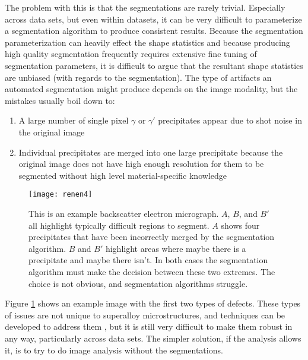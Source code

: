 \documentclass[review]{elsarticle}
\begin{document}
		The problem with this is that the segmentations are rarely trivial. Especially across data sets, but even within datasets, it can be very difficult to parameterize a segmentation algorithm to produce consistent results. Because the segmentation parameterization can heavily effect the shape statistics and because producing high quality segmentation frequently requires extensive fine tuning of segmentation parameters, it is difficult to argue that the resultant shape statistics are unbiased (with regards to the segmentation). The type of artifacts an automated segmentation might produce depends on the image modality, but the mistakes usually boil down to:

		\begin{enumerate}
			\item \label{prob1} A large number of single pixel $\gamma$ or $\gamma'$ precipitates appear due to shot noise in the original image
			\item Individual precipitates are merged into one large precipitate because the original image does not have high enough resolution for them to be segmented without high level material-specific knowledge
		\end{enumerate}
	
		\begin{figure}[!ht]
	  		\centering
			\texttt{[image: renen4]}
	  		\caption{ This is an example backscatter electron micrograph. $A$, $B$, and $B'$ all highlight typically difficult regions to segment. $A$ shows four precipitates that have been incorrectly merged by the segmentation algorithm. $B$ and $B'$ highlight areas where maybe there is a precipitate and maybe there isn't. In both cases the segmentation algorithm must make the decision between these two extremes. The choice is not obvious, and segmentation algorithms struggle. }
	  		\label{figure1}
		\end{figure}

		Figure \ref{figure1} shows an example image with the first two types of defects. These types of issues are not unique to superalloy microstructures, and techniques can be developed to address them \cite{comer, marc1, marc2, marc3}, but it is still very difficult to make them robust in any way, particularly across data sets. The simpler solution, if the analysis allows it, is to try to do image analysis without the segmentations.
	
\end{document}

